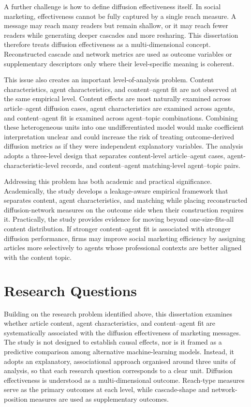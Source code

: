 A further challenge is how to define diffusion effectiveness itself. In social marketing, effectiveness cannot be fully captured by a single reach measure. A message may reach many readers but remain shallow, or it may reach fewer readers while generating deeper cascades and more resharing. This dissertation therefore treats diffusion effectiveness as a multi-dimensional concept. Reconstructed cascade and network metrics are used as outcome variables or supplementary descriptors only where their level-specific meaning is coherent.

This issue also creates an important level-of-analysis problem. Content characteristics, agent characteristics, and content–agent fit are not observed at the same empirical level. Content effects are most naturally examined across article–agent diffusion cases, agent characteristics are examined across agents, and content–agent fit is examined across agent–topic combinations. Combining these heterogeneous units into one undifferentiated model would make coefficient interpretation unclear and could increase the risk of treating outcome-derived diffusion metrics as if they were independent explanatory variables. The analysis adopts a three-level design that separates content-level article–agent cases, agent-characteristic-level records, and content–agent matching-level agent–topic pairs.

Addressing this problem has both academic and practical significance. Academically, the study develops a leakage-aware empirical framework that separates content, agent characteristics, and matching while placing reconstructed diffusion-network measures on the outcome side when their construction requires it. Practically, the study provides evidence for moving beyond one-size-fits-all content distribution. If stronger content–agent fit is associated with stronger diffusion performance, firms may improve social marketing efficiency by assigning articles more selectively to agents whose professional contexts are better aligned with the content topic.

\section{Research Questions}
\label{sec:1-3-research-questions}

Building on the research problem identified above, this dissertation examines whether article content, agent characteristics, and content–agent fit are systematically associated with the diffusion effectiveness of marketing messages. The study is not designed to establish causal effects, nor is it framed as a predictive comparison among alternative machine-learning models. Instead, it adopts an explanatory, associational approach organised around three units of analysis, so that each research question corresponds to a clear unit. Diffusion effectiveness is understood as a multi-dimensional outcome. Reach-type measures serve as the primary outcomes at each level, while cascade-shape and network-position measures are used as supplementary outcomes.

